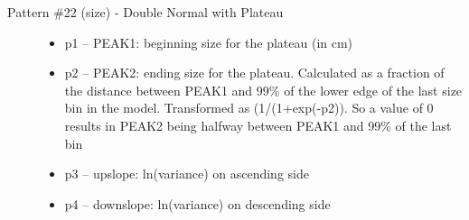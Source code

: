 \begin{description}
	\item[Pattern \#22 (size) - Double Normal with Plateau]\hfil
	\begin{itemize}
		\item p1 – PEAK1:  beginning size for the plateau (in cm)
		\item p2 – PEAK2:  ending size for the plateau.  Calculated as a fraction of the distance between PEAK1 and 99\% of the lower edge of the last size bin in the model.  Transformed as (1/(1+exp(-p2)).   So a value of 0 results in PEAK2 being halfway between PEAK1 and 99\% of the last bin
		\item p3 – upslope:  ln(variance) on ascending side
		\item p4 – downslope:  ln(variance) on descending side
	\end{itemize}
\end{description}

